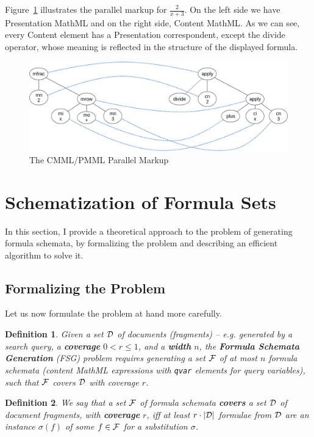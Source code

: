 \documentclass[a4paper,oneside]{article}
\newtheorem{definition}{Definition}
\def\cmml{\textsf{Content MathML}\xspace}
\def\pmml{\textsf{Presentation MathML}\xspace}
\begin{document}
Figure~\ref{fig:crossreference_diag} illustrates the parallel markup for
$\frac{2}{x+3}$. On the left side we have \pmml and on the right side, \cmml.
As we can see, every Content element has a Presentation correspondent, except
the \textsf{divide} operator, whose meaning is reflected in the structure of
the displayed formula.

\begin{figure}[ht]\centering
    \includegraphics[scale=0.3]{img/crossreference_diag.png}
    \caption{The CMML/PMML Parallel Markup}\label{fig:crossreference_diag}
\end{figure}
\FloatBarrier

\section{Schematization of Formula Sets}\label{sec:schematization_fs}
In this section, I provide a theoretical approach to the problem of generating
formula schemata, by formalizing the problem and describing an efficient
algorithm to solve it.

\subsection{Formalizing the Problem}\label{subsec:formal_problem}
Let us now formulate the problem at hand more carefully.

\begin{definition}
  Given a set $\mathcal{D}$ of documents (fragments) -- e.g. generated by a search
  query, a \textbf{coverage} $0<r\leq1$, and a \textbf{width} $n$, the
  \textbf{Formula Schemata Generation} (FSG) problem requires generating
  a set $\mathcal{F}$ of at most $n$ formula schemata (content MathML expressions with
  \lstinline|qvar| elements for query variables), such that $\mathcal{F}$ covers $\mathcal{D}$
  with coverage $r$.
\end{definition}

\begin{definition}
  We say that a set $\mathcal{F}$ of formula schemata \textbf{covers} a set $\mathcal{D}$ of
  document fragments, with \textbf{coverage} $r$, iff at least $r \cdot |\mathcal{D}|$
  formulae from $\mathcal{D}$ are an instance $\sigma(f)$ of some $f\in\mathcal{F}$ for a
  substitution $\sigma$.
\end{definition}
\end{document}
